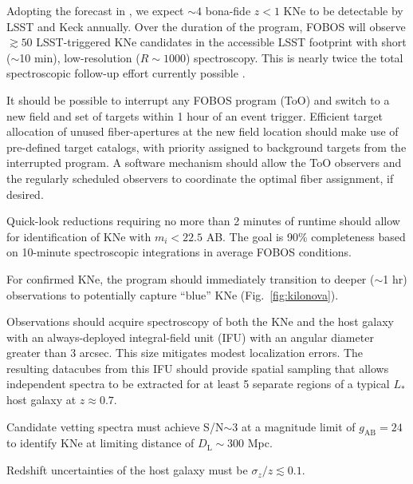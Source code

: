 \documentclass[11pt,a4paper,twoside,onecolumn,openany,final,oldfontcommands]{memoir}
\begin{document}
\begin{programrequirement}
\reqitem Adopting the forecast in \citet{margutti2018}, we expect $\sim4$ bona-fide $z < 1$ KNe to be detectable by LSST and Keck annually. Over the duration of the program, FOBOS will observe $\gtrsim50$ LSST-triggered KNe candidates in the accessible LSST footprint with short ($\sim$10 min), low-resolution ($R\sim1000$) spectroscopy.  This is nearly twice the total spectroscopic follow-up effort currently possible \citep{hosseinzadeh2019}.

\reqitem It should be possible to interrupt any FOBOS program (ToO) and switch to a new field and set of targets within 1 hour of an event trigger.  Efficient target allocation of unused fiber-apertures at the new field location should make use of pre-defined target catalogs, with priority assigned to background targets from the interrupted program.  A software mechanism should allow the ToO observers and the regularly scheduled observers to coordinate the optimal fiber assignment, if desired.


\reqitem Quick-look reductions requiring no more than 2 minutes of runtime should allow for identification of KNe with $m_i < 22.5$ AB.  The goal is 90\% completeness based on 10-minute spectroscopic integrations in average FOBOS conditions. 

\reqitem For confirmed KNe, the program should immediately transition to deeper ($\sim$1 hr) observations to potentially capture ``blue'' KNe (Fig.~\ref{fig:kilonova}).
\end{programrequirement}


\medskip
\begin{sciencerequirement}
\reqitem Observations should acquire spectroscopy of both the KNe and the host galaxy with an always-deployed integral-field unit (IFU) with an angular diameter greater than 3 arcsec.  This size mitigates modest localization errors.  The resulting datacubes from this IFU should provide spatial sampling that allows independent spectra to be extracted for at least 5 separate regions of a typical $L_*$ host galaxy at $z \approx 0.7$.

\reqitem Candidate vetting spectra must achieve S/N$\sim$3 at a magnitude limit of $g_\mathrm{AB}=24$ to identify KNe at limiting distance of $D_\mathrm{L}\sim300$ Mpc.  

\reqitem Redshift uncertainties of the host galaxy must be $\sigma_z/z \lesssim0.1$. 
\end{sciencerequirement}
\end{document}
